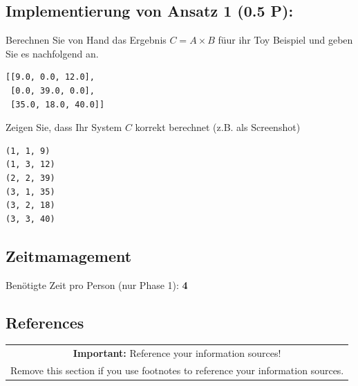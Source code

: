\documentclass[11pt]{scrartcl}
\begin{document}
\subsection*{Implementierung von Ansatz 1 (0.5 P):}
Berechnen Sie von Hand das Ergebnis $C = A \times B$ füur ihr Toy Beispiel und geben Sie es
nachfolgend an.

\begin{lstlisting}[style=dmrsql]
[[9.0, 0.0, 12.0], 
 [0.0, 39.0, 0.0], 
 [35.0, 18.0, 40.0]]
\end{lstlisting}

Zeigen Sie, dass Ihr System $C$ korrekt berechnet (z.B. als Screenshot)

\begin{lstlisting}[style=dmrsql]
(1, 1, 9)
(1, 3, 12)
(2, 2, 39)
(3, 1, 35)
(3, 2, 18)
(3, 3, 40)
\end{lstlisting}

\subsection*{Zeitmamagement}

Benötigte Zeit pro Person (nur Phase 1): \textbf{4}

\subsection*{References}

\begin{table}[H]
  \centering
  \begin{tabular}{c}
    \hline
    \textbf{Important:} Reference your information sources! \tabularnewline
    Remove this section if you use footnotes to reference your information sources. \tabularnewline
    \hline
  \end{tabular}
\end{table}
\end{document}
